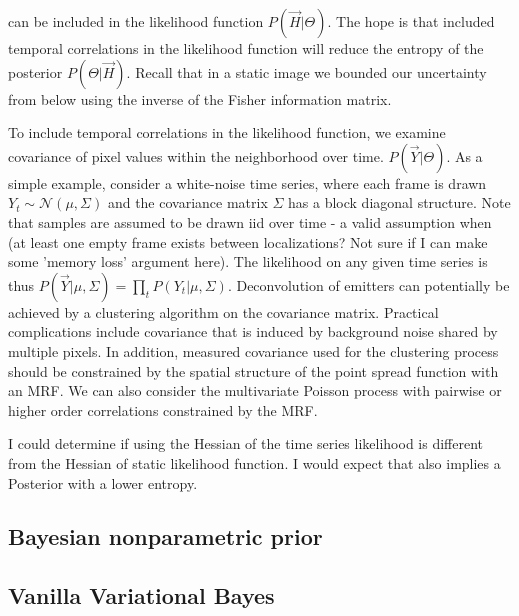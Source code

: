 \documentclass{ucetd}
\begin{document}
can be included in the likelihood function $P(\vec{H}|\Theta)$. The hope is that included temporal correlations in the likelihood function will reduce the entropy of the posterior $P(\Theta|\vec{H})$. Recall that in a static image we bounded our uncertainty from below using the inverse of the Fisher information matrix. 

To include temporal correlations in the likelihood function, we examine covariance of pixel values within the neighborhood over time. $P(\vec{Y}|\Theta)$. As a simple example, consider a white-noise time series, where each frame is drawn $Y_{t}\sim \mathcal{N}(\mu,\Sigma)$ and the covariance matrix $\Sigma$ has a block diagonal structure. Note that samples are assumed to be drawn iid over time - a valid assumption when (at least one empty frame exists between localizations? Not sure if I can make some 'memory loss' argument here). The likelihood on any given time series is thus $P(\vec{Y}|\mu,\Sigma) = \prod_{t}P(Y_{t}|\mu,\Sigma)$. Deconvolution of emitters can potentially be achieved by a clustering algorithm on the covariance matrix. Practical complications include covariance that is induced by background noise shared by multiple pixels. In addition, measured covariance used for the clustering process should be constrained by the spatial structure of the point spread function with an MRF. We can also consider the multivariate Poisson process with pairwise or higher order correlations constrained by the MRF. 

I could determine if using the Hessian of the time series likelihood is different from the Hessian of static likelihood function. I would expect that also implies a Posterior with a lower entropy. 


\subsection{Bayesian nonparametric prior}

\subsection{Vanilla Variational Bayes}
\end{document}
